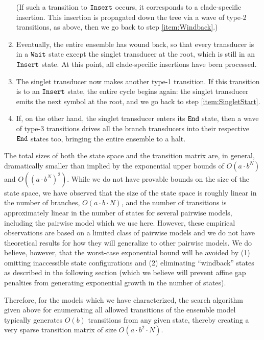 \documentclass[10pt]{article}
\begin{document}
\begin{enumerate}
  (If such a transition to $\mathtt{Insert}$ occurs, it corresponds to a clade-specific insertion.
  This insertion is propagated down the tree via a wave of type-2 transitions, as above,
  then we go back to step \ref{item:Windback}.)
\item Eventually, the entire ensemble has wound back, so that every transducer is in a $\mathtt{Wait}$ state except the singlet transducer at the root,
  which is still in an $\mathtt{Insert}$ state.
  At this point, all clade-specific insertions have been processed.
\item The singlet transducer now makes another type-1 transition.
  If this transition is to an $\mathtt{Insert}$ state, the entire cycle begins again: the singlet transducer emits the next symbol at the root,
  and we go back to step \ref{item:SingletStart}.
\item If, on the other hand, the singlet transducer enters its $\mathtt{End}$ state,
  then a wave of type-3 transitions drives all the branch transducers into their respective $\mathtt{End}$ states too,
  bringing the entire ensemble to a halt.
\end{enumerate}


The total sizes of both the state space and the transition matrix are,
in general, dramatically smaller than implied by the exponential upper
bounds of $O(a \cdot b^N)$ and $O((a \cdot b^N)^2)$.  While we do not
have provable bounds on the size of the state space, we have observed
that the size of the state space is roughly linear in the number of
branches, $O(a \cdot b \cdot N)$, and the number of transitions is
approximately linear in the number of states for several pairwise models,
including the pairwise model which we use here.
However, these empirical observations are based on a
limited class of pairwise models and we do not have theoretical results for
how they will generalize to other pairwise models.  We do believe, however,
that the worst-case exponential bound will be avoided by (1)
omitting inaccessible state configurations and (2) eliminating
``windback'' states as described in the following section (which we
believe will prevent affine gap penalties from generating exponential
growth in the number of states).

Therefore, for the models which we have characterized, the search
algorithm given above for enumerating all allowed transitions of the
ensemble model typically generates $O(b)$ transitions from any given
state, thereby creating a very sparse transition matrix of size $O(a \cdot b^2 \cdot N)$.
\end{document}

